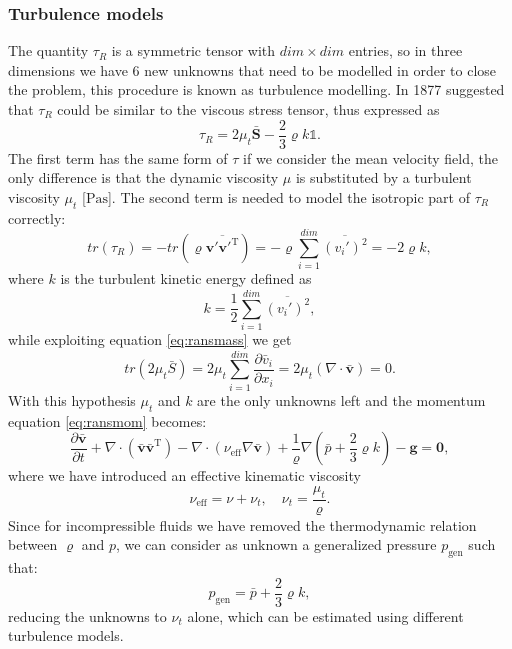 \subsubsection{Turbulence models}
The quantity $\tau_R$ is a symmetric tensor with $dim \times dim$ entries, so 
in three 
dimensions we have 6 new unknowns that need to be modelled in order to close 
the problem, this procedure is known as turbulence modelling.
In 1877 \textcite{ipo:boussinesq} suggested that $\tau_R$ could be similar to the viscous 
stress tensor, thus expressed as
\begin{equation} \label{eq:bouss}
\tau_R = 2\mu_t \bar{\mathbf{S}} - 
\frac{2}{3}\varrho k \mathbb{1}.
\end{equation}
The first term has the same form of $\tau$ if we consider the mean velocity 
field, 
the only difference is that the dynamic viscosity $\mu$ is substituted by a 
turbulent viscosity $\mu_t$ [$\si{\pascal \second}$]. The second term is needed 
to model the isotropic part of $\tau_R$ correctly:
\begin{equation} \label{eq:tracciatau}
tr(\tau_R) = -tr(\varrho \overline{\mathbf{v}' {\mathbf{v}'}^\mathrm{T}}) = 
-\varrho \sum_{i=1}^{dim} \overline{(v_i')^2} = -2\varrho k,
\end{equation}
where $k$ is the turbulent kinetic energy defined as
\begin{equation}
k = \frac{1}{2} \sum_{i=1}^{dim} \overline{(v_i')^2},
\end{equation}
while exploiting equation \eqref{eq:ransmass} we get
\begin{equation}
	tr(2\mu_t \bar{S}) = 2 \mu_t \sum_{i=1}^{dim} \frac{\partial 
	\bar{v}_i}{\partial x_i} = 2\mu_t (\nabla \cdot \bar{\mathbf{v}}) = 0.
\end{equation}
With this hypothesis $\mu_t$ and $k$ are the only unknowns left and the 
momentum equation \eqref{eq:ransmom} becomes:
\begin{equation} \label{eq:ransmom2}
\frac{\partial \bar{\mathbf{v}}}{\partial t} + \nabla 
\cdot ( \bar{\mathbf{v}} \bar{\mathbf{v}}^\mathrm{T}) - \nabla \cdot 
(\nu_\text{eff} \nabla \bar{\mathbf{v}}) + \frac{1}{\varrho}\nabla (\bar{p} + 
\frac{2}{3}\varrho k) - \mathbf{g} = \mathbf{0},
\end{equation}
where we have introduced an effective kinematic viscosity
\begin{equation}
	\nu_\text{eff} = \nu + \nu_t, \quad \nu_t = \frac{\mu_t}{\varrho}.
\end{equation}
Since for incompressible fluids we have removed the thermodynamic relation 
between $\varrho$ and $p$, we can consider as unknown a generalized pressure 
$p_\text{gen}$ such that:
\begin{equation}
p_\text{gen} = \bar{p} + \frac{2}{3}\varrho k,
\end{equation}
reducing the unknowns to $\nu_t$ alone, which can be estimated using different 
turbulence models.

